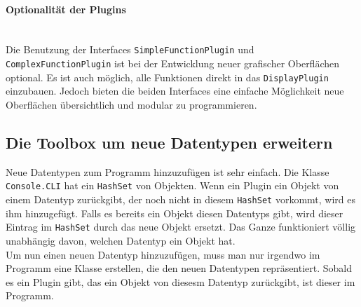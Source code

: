 \paragraph{Optionalität der Plugins}\ \\
Die Benutzung der Interfaces \lstinline[columns=fixed]{SimpleFunctionPlugin} und \lstinline[columns=fixed]{ComplexFunctionPlugin} ist bei der Entwicklung neuer grafischer Oberflächen optional. Es ist auch möglich, alle Funktionen direkt in das \lstinline[columns=fixed]{DisplayPlugin} einzubauen. Jedoch bieten die beiden Interfaces eine einfache Möglichkeit neue Oberflächen übersichtlich und modular zu programmieren.
\subsection{Die Toolbox um neue Datentypen erweitern}
\label{sec:3.4}
Neue Datentypen zum Programm hinzuzufügen ist sehr einfach. Die Klasse \lstinline[columns=fixed]{Console.CLI} hat ein \lstinline[columns=fixed]{HashSet} von Objekten. Wenn ein Plugin ein Objekt von einem Datentyp zurückgibt, der noch nicht in diesem \lstinline[columns=fixed]{HashSet} vorkommt, wird es ihm hinzugefügt. Falls es bereits ein Objekt diesen Datentyps gibt, wird dieser Eintrag im \lstinline[columns=fixed]{HashSet} durch das neue Objekt ersetzt. Das Ganze funktioniert völlig unabhängig davon, welchen Datentyp ein Objekt hat.\\
Um nun einen neuen Datentyp hinzuzufügen, muss man nur irgendwo im Programm eine Klasse erstellen, die den neuen Datentypen repräsentiert. Sobald es ein Plugin gibt, das ein Objekt von diesesm Datentyp zurückgibt, ist dieser im Programm.